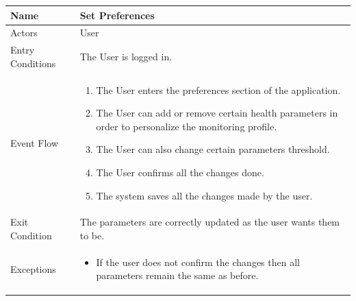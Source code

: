 \begin{enumerate}
\FloatBarrier
\begin{table}[h]
\begin{tabular}{|l|p{}|}
\hline
Name             & Set Preferences \\ \hline
Actors           & User  \\ \hline
Entry Conditions & The User is logged in. \\ \hline
Event Flow       & \begin{enumerate}
            \item The User enters the preferences section of the application.
            \item The User can add or remove certain health parameters in order to personalize the monitoring profile.
            \item The User can also change certain parameters threshold.
            \item The User confirms all the changes done.
            \item The system saves all the changes made by the user.
        \end{enumerate}\\ \hline
Exit Condition   & The parameters are correctly updated as the user wants them to be.\\ \hline
Exceptions       & \begin{itemize}
\item If the user does not confirm the changes then all parameters remain the same as before. 
\end{itemize} \\ \hline
\end{tabular}
\end{table}
\FloatBarrier


\end{enumerate}
